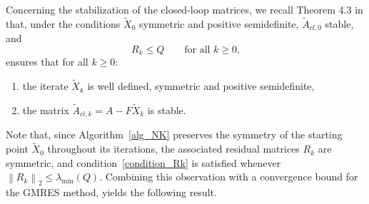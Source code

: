 \documentclass[a4paper,10pt]{article}
\newcommand{\norm}[1]{\left\lVert#1\right\rVert}
\begin{document}
Concerning the stabilization of the closed-loop matrices, we recall Theorem 4.3 in \cite{feitzinger2009inexact} that, under the conditions $\tilde{X}_0$ symmetric and positive semidefinite, $\tilde{A}_{cl,0}$ stable, and
\begin{equation}
	R_{k} \le  Q\qquad \text{for all $k\ge 0$,}
	\label{condition_Rk}
\end{equation}
ensures that for all $k\ge 0$:
\begin{enumerate}
	\item[(i)] the iterate $\widetilde X_{k}$  is well defined, symmetric and positive semidefinite,
	\item[(ii)]  the matrix $\widetilde {A}_{cl,k}= A-F\widetilde X_{k}$ is stable.
\end{enumerate}

Note that, since Algorithm~\ref{alg_NK} preserves the symmetry of the starting point $\tilde X_0$ throughout its iterations, the associated residual matrices $R_k$ are symmetric, and condition~\eqref{condition_Rk} is satisfied whenever $\norm{R_k}_2\le \lambda_{\min}(Q)$. Combining this observation with a convergence bound for the GMRES method, yields the following result.
\end{document}
